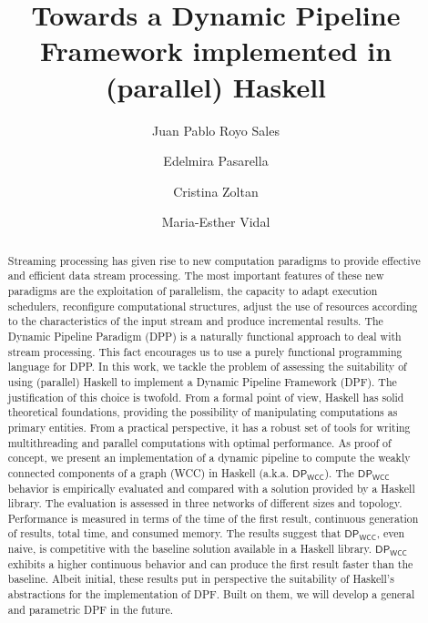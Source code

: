 \documentclass[preprint]{elsarticle}
\title{Towards a Dynamic Pipeline Framework implemented in (parallel) Haskell\tnoteref{t1}}
\author[1]{Juan Pablo Royo Sales}
\author[1]{Edelmira Pasarella}
\author[1]{Cristina Zoltan}
\author[2]{Maria-Esther Vidal}
\affiliation[1]{organization={Universitat Politecnica de Catalunya},
postcode={08034},
city={Barcelona},
country={Spain}}
\affiliation[2]{organization={TIB/L3S Research Centre at the University of Hannover},
city={Hannover},
country={Germany}}
\newcommand{\dpwcc}{\mathsf{DP_{WCC}}}
\begin{document}
\begin{abstract}
Streaming processing has given rise to new computation paradigms to provide effective and efficient data stream processing. The most important features of these new paradigms are the exploitation of parallelism, the capacity to adapt execution schedulers, reconfigure computational structures, adjust the use of resources according to the characteristics of the input stream and produce incremental results. The Dynamic Pipeline Paradigm (DPP) is a naturally functional approach to deal with stream processing. This fact encourages us to use a  purely functional programming language for  DPP.  In this work, we tackle the problem of assessing the suitability of using (parallel) Haskell to implement a Dynamic Pipeline Framework (DPF).  The justification of this choice is twofold. From a formal point of view, Haskell has solid theoretical foundations, providing the possibility of manipulating computations as primary entities. From a practical perspective,  it has a robust set of tools for writing multithreading and parallel computations with optimal performance. As proof of concept, we present an implementation of a dynamic pipeline to compute the weakly connected components of a graph (WCC) in Haskell (a.k.a. $\dpwcc$). The  $\dpwcc$ behavior is empirically evaluated and compared with a solution provided by a Haskell library. The evaluation is assessed in three networks of different sizes and topology. Performance is measured in terms of the time of the first result, continuous generation of results, total time, and consumed memory. The results suggest that $\dpwcc$, even naive, is competitive with the baseline solution available in a Haskell library. $\dpwcc$ exhibits a higher continuous behavior and can produce the first result faster than the baseline. 
Albeit initial,  these results put in perspective the suitability of Haskell's abstractions for the implementation of DPF.  Built on them, we will develop a general and parametric DPF in the future.



\end{abstract}
\end{document}
